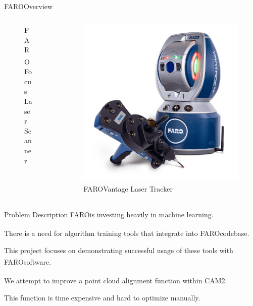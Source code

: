 \documentclass[10pt]{beamer}
\newcommand{\faro}[0]{FARO\textsuperscript{\textregistered}\space}
\begin{document}
\begin{frame}{\faro Overview}
\begin{columns}
\begin{column}{0.30\textwidth}
\begin{figure}
          \caption*{\faro Focus \newline Laser Scanner}
        \end{figure}
      \end{column}
      \begin{column}{0.30\textwidth}
        \begin{figure}
          \centering
          \includegraphics[width=\textwidth]{images/faro-probe.jpg}
          \caption*{\faro Vantage \newline Laser Tracker}
        \end{figure}
      \end{column}
    \end{columns}
  \end{frame}
  \begin{frame}{Problem Description}
    \faro is investing heavily in machine learning. 

    There is a need for algorithm training tools that integrate into \faro codebase.

    This project focuses on demonstrating successful usage of these tools with \faro software.

    We attempt to improve a point cloud alignment function within CAM2\textsuperscript{\textregistered}.

    This function is time expensive and hard to optimize manually.
  \end{frame}
\end{document}
